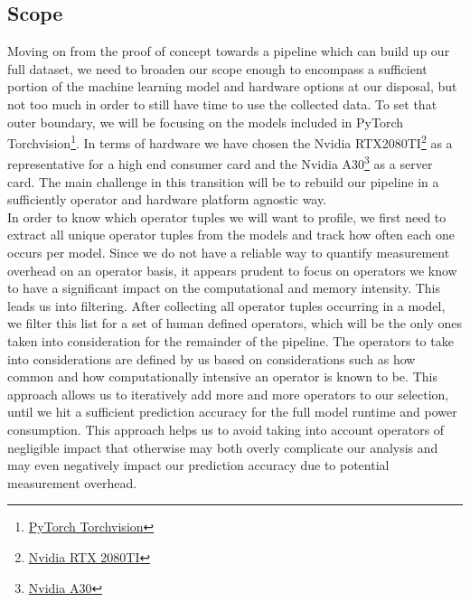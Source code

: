 \documentclass[conference]{IEEEtran}
\begin{document}
\subsection{Scope}
Moving on from the proof of concept towards a pipeline which can build up our full dataset, we need to broaden our scope enough to encompass a sufficient portion of the machine learning model and hardware options at our disposal, but not too much in order to still have time to use the collected data.
To set that outer boundary, we will be focusing on the models included in PyTorch Torchvision\footnote{\href{https://pytorch.org/vision/stable/index.html}{PyTorch Torchvision}}. In terms of hardware we have chosen the Nvidia RTX2080TI\footnote{\href{https://www.techpowerup.com/gpu-specs/geforce-rtx-2080-ti.c3305}{Nvidia RTX 2080TI}} as a representative for a high end consumer card and the Nvidia A30\footnote{\href{https://www.techpowerup.com/gpu-specs/a30-pcie.c3792}{Nvidia A30}} as a server card. The main challenge in this transition will be to rebuild our pipeline in a sufficiently operator and hardware platform agnostic way. \\
In order to know which operator tuples we will want to profile, we first need to extract all unique operator tuples from the models and track how often each one occurs per model. Since we do not have a reliable way to quantify measurement overhead on an operator basis, it appears prudent to focus on operators we know to have a significant impact on the computational and memory intensity. This leads us into filtering. After collecting all operator tuples occurring in a model, we filter this list for a set of human defined operators, which will be the only ones taken into consideration for the remainder of the pipeline. The operators to take into considerations are defined by us based on considerations such as how common and how computationally intensive an operator is known to be. This approach allows us to iteratively add more and more operators to our selection, until we hit a sufficient prediction accuracy for the full model runtime and power consumption. This approach helps us to avoid taking into account operators of negligible impact that otherwise may both overly complicate our analysis and may even negatively impact our prediction accuracy due to potential measurement overhead. 
\end{document}
